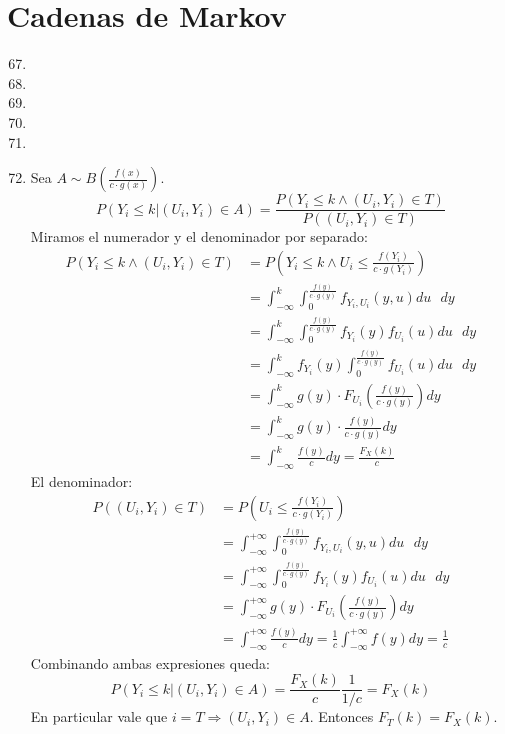 \section{Cadenas de Markov}
\begin{enumerate}
	\setcounter{enumi}{66}
	\item
	\item
	\item
	\item
	\item
	\item
		Sea $A\sim B\left(\frac{f(x)}{c\cdot g(x)}\right)$.
		$$P(Y_i \leq k | (U_i, Y_i) \in A) = \frac{P(Y_i \leq k \land (U_i, Y_i) \in T)}{P( (U_i, Y_i) \in T)}$$
		Miramos el numerador y el denominador por separado:
		\begin{align*}
			P(Y_i \leq k \land (U_i, Y_i) \in T)	& = P\left(Y_i \leq k \land U_i \leq \frac{f(Y_i)}{c\cdot g(Y_i)}\right)		\\
									& = \int_{-\infty}^{k}\int_{0}^{\frac{f(y)}{c\cdot g(y)}} f_{Y_i,U_i}(y,u) du\text{ }dy			\\
									& = \int_{-\infty}^{k}\int_{0}^{\frac{f(y)}{c\cdot g(y)}} f_{Y_i}(y)f_{U_i}(u) du\text{ }dy		\\
									& = \int_{-\infty}^{k} f_{Y_i}(y) \int_{0}^{\frac{f(y)}{c\cdot g(y)}} f_{U_i}(u) du\text{ }dy	\\
									& = \int_{-\infty}^{k} g(y)\cdot F_{U_i}\left(\frac{f(y)}{c\cdot g(y)}\right) dy				\\
									& = \int_{-\infty}^{k} g(y)\cdot \frac{f(y)}{c\cdot g(y)} dy									\\
									& = \int_{-\infty}^{k} \frac{f(y)}{c} dy = \frac{F_X(k)}{c}
		\end{align*}
		El denominador:
		\begin{align*}
			P((U_i, Y_i) \in T)	& = P\left(U_i \leq \frac{f(Y_i)}{c\cdot g(Y_i)}\right)	\\
								& = \int_{-\infty}^{+\infty}\int_{0}^{\frac{f(y)}{c\cdot g(y)}} f_{Y_i,U_i}(y,u) du\text{ }dy		\\
								& = \int_{-\infty}^{+\infty}\int_{0}^{\frac{f(y)}{c\cdot g(y)}} f_{Y_i}(y)f_{U_i}(u) du\text{ }dy	\\
								& = \int_{-\infty}^{+\infty}g(y)\cdot F_{U_i}\left(\frac{f(y)}{c\cdot g(y)}\right) dy				\\
								& = \int_{-\infty}^{+\infty}\frac{f(y)}{c} dy = \frac{1}{c} \int_{-\infty}^{+\infty}f(y) dy	= \frac{1}{c}
		\end{align*}
		Combinando ambas expresiones queda:
		$$P(Y_i \leq k | (U_i, Y_i) \in A) = \frac{F_X(k)}{c} \frac{1}{1/c} = F_X(k)$$
		En particular vale que $i=T \Rightarrow (U_i, Y_i) \in A$.
		Entonces $F_T(k) = F_X(k)$.
\end{enumerate}
